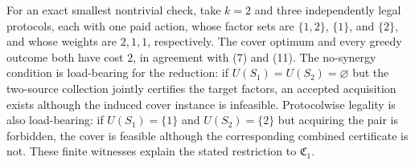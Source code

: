 For an exact smallest nontrivial check, take \(k=2\) and three independently legal protocols, each with one paid action, whose factor sets are \(\{1,2\}\), \(\{1\}\), and \(\{2\}\), and whose weights are \(2,1,1\), respectively.  The cover optimum and every greedy outcome both have cost \(2\), in agreement with (7) and (11).  The no-synergy condition is load-bearing for the reduction: if \(U(S_1)=U(S_2)=\varnothing\) but the two-source collection jointly certifies the target factors, an accepted acquisition exists although the induced cover instance is infeasible.  Protocolwise legality is also load-bearing: if \(U(S_1)=\{1\}\) and \(U(S_2)=\{2\}\) but acquiring the pair is forbidden, the cover is feasible although the corresponding combined certificate is not.  These finite witnesses explain the stated restriction to \(\mathfrak C_1\).
